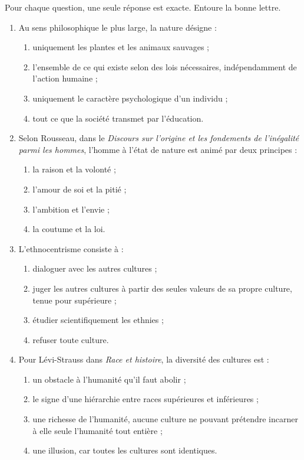 \documentclass[11pt]{article}
\newcommand{\cle}[1]{{\popxbold\color{popdark}#1}}
\begin{document}
\begin{exercice}
Pour chaque question, une seule réponse est exacte. Entoure la bonne lettre.

\begin{enumerate}
\item Au sens philosophique le plus large, la \cle{nature} désigne :
\begin{enumerate}
\item uniquement les plantes et les animaux sauvages ;
\item l'ensemble de ce qui existe selon des lois nécessaires, indépendamment de l'action humaine ;
\item uniquement le caractère psychologique d'un individu ;
\item tout ce que la société transmet par l'éducation.
\end{enumerate}

\item Selon Rousseau, dans le \emph{Discours sur l'origine et les fondements de l'inégalité parmi les hommes}, l'homme à l'état de nature est animé par deux principes :
\begin{enumerate}
\item la raison et la volonté ;
\item l'amour de soi et la pitié ;
\item l'ambition et l'envie ;
\item la coutume et la loi.
\end{enumerate}

\item L'\cle{ethnocentrisme} consiste à :
\begin{enumerate}
\item dialoguer avec les autres cultures ;
\item juger les autres cultures à partir des seules valeurs de sa propre culture, tenue pour supérieure ;
\item étudier scientifiquement les ethnies ;
\item refuser toute culture.
\end{enumerate}

\item Pour Lévi-Strauss dans \emph{Race et histoire}, la diversité des cultures est :
\begin{enumerate}
\item un obstacle à l'humanité qu'il faut abolir ;
\item le signe d'une hiérarchie entre races supérieures et inférieures ;
\item une richesse de l'humanité, aucune culture ne pouvant prétendre incarner à elle seule l'humanité tout entière ;
\item une illusion, car toutes les cultures sont identiques.
\end{enumerate}
\end{enumerate}
\end{exercice}
\end{document}
